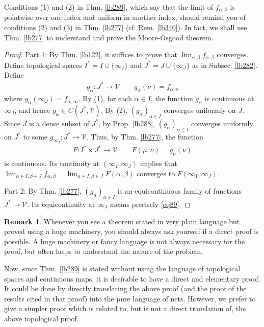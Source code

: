 \documentclass[12pt,b5paper,notitlepage]{article}
\theoremstyle{definition}
\newtheorem{rem}[df]{Remark}
\theoremstyle{plain}
\newcommand{\mc}{\mathcal}
\newcommand{\dps}{\displaystyle}
\numberwithin{equation}{section}
\begin{document}
Conditions (1) and (2) in Thm. \ref{lb289}, which say that the limit of $f_{\alpha,\beta}$ is pointwise over one index and uniform in another index, should remind you of conditions (2) and (3) in Thm. \ref{lb277} (cf. Rem. \ref{lb340}). In fact, we shall use Thm. \ref{lb277} to understand and prove the Moore-Osgood theorem.


\begin{proof}
Part 1: By Thm. \ref{lb122}, it suffices to prove that $\lim_{\alpha,\beta}f_{\alpha,\beta}$ converges. Define topological spaces $I^*=I\cup\{\infty_I\}$ and $J^*=J\cup\{\infty_J\}$ as in Subsec. \ref{lb282}. Define 
\begin{gather*}
g_\alpha:J^*\rightarrow\mc V\qquad g_\alpha(\nu)=f_{\alpha,\nu}
\end{gather*}
where $g_\alpha(\infty_J)=f_{\alpha,\infty}$. By (1), for each $\alpha\in I$, the function $g_\alpha$ is continuous at $\infty_J$, and hence $g_\alpha\in C(J^*,\mc V)$. By (2), $(g_\alpha)_{\alpha\in I}$ converges uniformly on $J$. Since $J$ is a dense subset of $J^*$, by Prop. \ref{lb288}, $(g_\alpha)_{\alpha\in I}$ converges uniformly on $J^*$ to some $g_{\infty_I}:J^*\rightarrow\mc V$. Thus, by Thm. \ref{lb277}, the function
\begin{align*}
F:I^*\times J^*\rightarrow\mc V\qquad F(\mu,\nu)=g_\mu(\nu)
\end{align*}
is continuous. Its continuity at $(\infty_I,\infty_J)$ implies that $\dps\lim_{\alpha\in I,\beta\in J}f_{\alpha,\beta}=\dps\lim_{\alpha\in I,\beta\in J} F(\alpha,\beta)$ converges to $F(\infty_I,\infty_J)$.

Part 2: By Thm. \ref{lb277}, $(g_\alpha)_{\alpha\in I}$ is an equicontinuous family of functions $J^*\rightarrow\mc V$. Its equicontinuity at $\infty_J$ means precisely \eqref{eq89}.
\end{proof}


\begin{rem}
Whenever you see a theorem stated in very plain language but proved using a huge machinery, you should always ask yourself if a direct proof is possible. A huge machinery or fancy language is not always necessary for the proof, but often helps to understand the nature of the problem.

Now, since Thm. \ref{lb289} is stated without using the language of topological spaces and continuous maps, it is desirable to have a direct and elementary proof. It could be done by directly translating the above proof (and the proof of the results cited in that proof) into the pure language of nets. However, we prefer to give a simpler proof which is related to, but is not a direct translation of, the above topological proof.   \hfill\qedsymbol
\end{rem}
\end{document}

